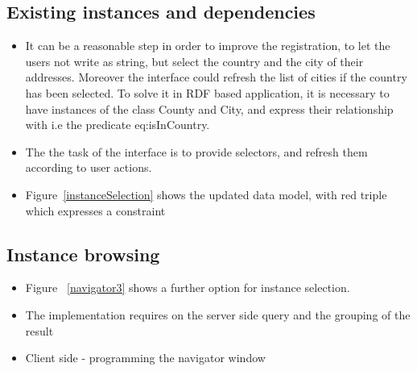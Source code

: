 



\subsection{Existing instances and dependencies}

\begin{itemize}
	\item It can be a reasonable step in order to improve the registration, to let the users not write as string, but select the country and the city of their addresses. Moreover the interface could refresh the list of cities if the country has been selected. To solve it in RDF based application, it is necessary to have instances of the class County and City, and express their relationship with i.e the predicate eq:isInCountry.
	\item The the task of the interface is to provide selectors, and refresh them according to user actions.
	\item Figure~\ref{instanceSelection} shows the updated data model, with red triple which expresses a constraint
\end{itemize}


\subsection{Instance browsing}

\begin{itemize}
	\item Figure ~\ref{navigator3} shows a further option for instance selection. 
\end{itemize}


\begin{itemize}
	\item The implementation requires on the server side query and the grouping of the result
	\item Client side - programming the navigator window
\end{itemize}

